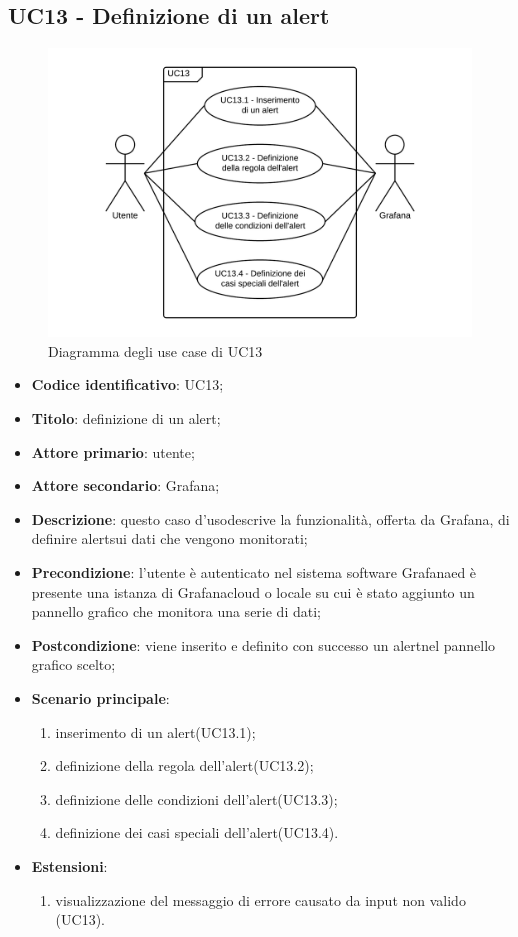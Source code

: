 \subsection{UC13 - Definizione di un alert}
\begin{figure}[H]
\includegraphics{img/UC13_-_Definizione_di_un_alert.png}
\caption{Diagramma degli use case di UC13}
\end{figure}
\begin{itemize}
	\item \textbf{Codice identificativo}: UC13;
	\item \textbf{Titolo}: definizione di un alert\glo;
	\item \textbf{Attore primario}: utente;
	\item \textbf{Attore secondario}: Grafana\glo;
	\item \textbf{Descrizione}: questo caso d'uso\glosp descrive la funzionalità, offerta da Grafana\glo, di definire alert\glosp sui dati che vengono monitorati;
	\item \textbf{Precondizione}: l'utente è autenticato nel sistema software Grafana\glosp ed è presente una istanza di Grafana\glosp cloud o locale su cui è stato aggiunto un pannello grafico che monitora una serie di dati;
	\item \textbf{Postcondizione}: viene inserito e definito con successo un alert\glosp nel pannello grafico scelto;
	\item \textbf{Scenario principale}: 
	\begin{enumerate}
		\item inserimento di un alert\glosp (UC13.1);
		\item definizione della regola dell'alert\glosp (UC13.2);
		\item definizione delle condizioni dell'alert\glosp (UC13.3);
		\item definizione dei casi speciali dell'alert\glosp (UC13.4).
	\end{enumerate}

	\item \textbf{Estensioni}:	
	\begin{enumerate}
		\item visualizzazione del messaggio di errore causato da input non valido (UC13).
	\end{enumerate}
\end{itemize}

